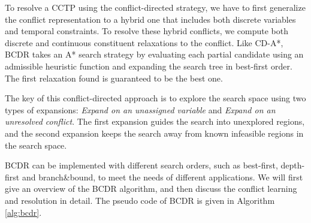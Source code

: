 \documentclass[jair,twoside,11pt,theapa]{article}
\begin{document}
To resolve a CCTP using the conflict-directed strategy, we have to first
generalize the conflict representation to a hybrid one that includes both
discrete variables and temporal constraints. To resolve these hybrid conflicts,
we compute both discrete and continuous constituent relaxations to the
conflict. Like CD-A*, BCDR takes an A* search strategy by evaluating each
partial candidate using an admissible heuristic function and expanding the
search tree in best-first order. The first relaxation found is guaranteed to be
the best one.


The key of this conflict-directed approach is to explore the search space using
two types of expansions: \textit{Expand on an unassigned variable} and
\textit{Expand on an unresolved conflict}. The first expansion guides the search
into unexplored regions, and the second expansion keeps the search away from
known infeasible regions in the search space. 


%
%
%
%
%
%
%
%



BCDR can be implemented with
different search orders, such as best-first, depth-first and branch\&bound, to
meet the needs of different applications. We will first give an overview
of the BCDR algorithm, and then discuss the conflict learning and resolution in
detail. The pseudo code of BCDR is given in Algorithm \ref{alg:bcdr}.
	
\end{document}
